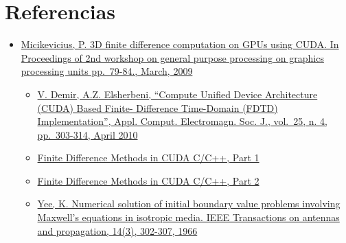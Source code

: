 \documentclass[]{article}
\begin{document}
\section{Referencias}\label{referencias}

\begin{itemize}
\item
  \href{https://drive.google.com/open?id=0B1GlF2qCvHCXa0JYWHBNcVdmSUk}{Micikevicius,
  P. 3D finite difference computation on GPUs using CUDA. In Proceedings
  of 2nd workshop on general purpose processing on graphics processing
  units pp.~79-84., March, 2009}

  \begin{itemize}
  \item
    \href{https://drive.google.com/open?id=0B1GlF2qCvHCXUlk5NUx1THNxczQ}{V.
    Demir, A.Z. Elsherbeni, ``Compute Unified Device Architecture (CUDA)
    Based Finite- Difference Time-Domain (FDTD) Implementation'', Appl.
    Comput. Electromagn. Soc. J., vol.~25, n. 4, pp.~303-314, April
    2010}
  \item
    \href{https://devblogs.nvidia.com/parallelforall/finite-difference-methods-cuda-cc-part-1/}{Finite
    Difference Methods in CUDA C/C++, Part 1}
  \item
    \href{https://devblogs.nvidia.com/parallelforall/finite-difference-methods-cuda-c-part-2/}{Finite
    Difference Methods in CUDA C/C++, Part 2}
  \item
    \href{https://drive.google.com/open?id=0B1GlF2qCvHCXMkJSWHdhSkFFRFE}{Yee,
    K. Numerical solution of initial boundary value problems involving
    Maxwell's equations in isotropic media. IEEE Transactions on
    antennas and propagation, 14(3), 302-307, 1966}
  \end{itemize}
\end{itemize}
\end{document}
